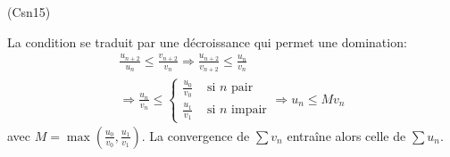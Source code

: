 \begin{tiny}(Csn15)\end{tiny} La condition se traduit par une décroissance qui permet une domination:
\begin{multline*}
\frac{u_{n+2}}{u_n}\leq \frac{v_{n+2}}{v_n} 
\Rightarrow \frac{u_{n+2}}{v_{n+2}}\leq \frac{u_n}{v_n} \\
\Rightarrow
\frac{u_n}{v_n} \leq 
\left\lbrace 
\begin{aligned}
  \frac{u_0}{v_0} &\text{ si $n$ pair} \\
  \frac{u_1}{v_1} &\text{ si $n$ impair}
\end{aligned}
\right. 
\Rightarrow u_n \leq M v_n
\end{multline*}
avec $M=\max(\frac{u_0}{v_0},\frac{u_1}{v_1})$. La convergence de $\sum v_n$ entraîne alors celle de $\sum u_n$.